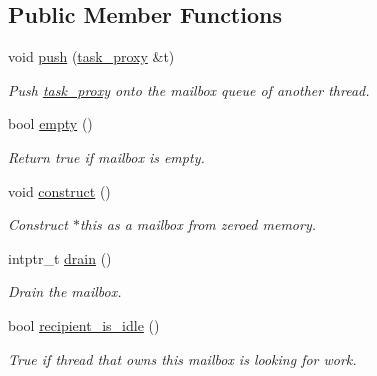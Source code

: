 \subsection*{Public Member Functions}
\begin{DoxyCompactItemize}
\item 
void \hyperlink{classtbb_1_1internal_1_1mail__outbox_a611892d31c67b4b4c9381abddefde238}{push} (\hyperlink{structtbb_1_1internal_1_1task__proxy}{task\+\_\+proxy} \&t)
\begin{DoxyCompactList}\small\item\em Push \hyperlink{structtbb_1_1internal_1_1task__proxy}{task\+\_\+proxy} onto the mailbox queue of another thread. \end{DoxyCompactList}\item 
\hypertarget{classtbb_1_1internal_1_1mail__outbox_aa4b26c4528a742391d358e22d7493763}{}bool \hyperlink{classtbb_1_1internal_1_1mail__outbox_aa4b26c4528a742391d358e22d7493763}{empty} ()\label{classtbb_1_1internal_1_1mail__outbox_aa4b26c4528a742391d358e22d7493763}

\begin{DoxyCompactList}\small\item\em Return true if mailbox is empty. \end{DoxyCompactList}\item 
void \hyperlink{classtbb_1_1internal_1_1mail__outbox_af6072a4a688633e6e754cf93f541e2cb}{construct} ()
\begin{DoxyCompactList}\small\item\em Construct $\ast$this as a mailbox from zeroed memory. \end{DoxyCompactList}\item 
\hypertarget{classtbb_1_1internal_1_1mail__outbox_af2367d906b2272e9ed1ea77055782144}{}intptr\+\_\+t \hyperlink{classtbb_1_1internal_1_1mail__outbox_af2367d906b2272e9ed1ea77055782144}{drain} ()\label{classtbb_1_1internal_1_1mail__outbox_af2367d906b2272e9ed1ea77055782144}

\begin{DoxyCompactList}\small\item\em Drain the mailbox. \end{DoxyCompactList}\item 
\hypertarget{classtbb_1_1internal_1_1mail__outbox_acaf8c50736e4d27b6755f006f1a5a38e}{}bool \hyperlink{classtbb_1_1internal_1_1mail__outbox_acaf8c50736e4d27b6755f006f1a5a38e}{recipient\+\_\+is\+\_\+idle} ()\label{classtbb_1_1internal_1_1mail__outbox_acaf8c50736e4d27b6755f006f1a5a38e}

\begin{DoxyCompactList}\small\item\em True if thread that owns this mailbox is looking for work. \end{DoxyCompactList}\end{DoxyCompactItemize}
